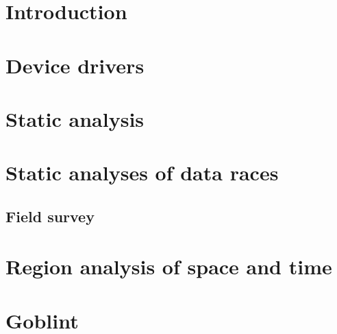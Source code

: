 \documentclass{style/master-thesis}
\begin{document}
\section{Introduction}


\pagebreak

\section{Device drivers}
\label{sec:device-drivers}


\pagebreak


\section{Static analysis}
\label{sec:static-analysis}


\pagebreak

\section{Static analyses of data races}
\label{sec:data-races}


\subsection{Field survey}


\pagebreak


%

\section{Region analysis of space and time}
\label{sec:region}


\pagebreak


\section{Goblint}
\label{sec:goblint}
%



\pagebreak
\end{document}
